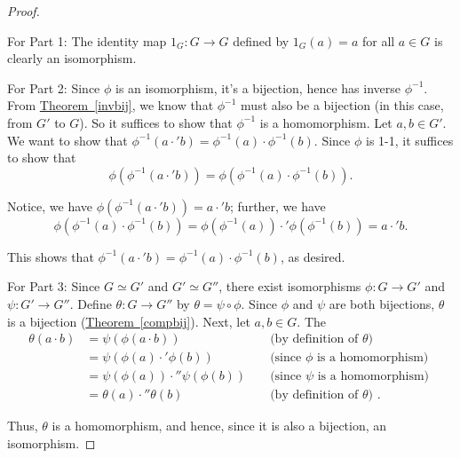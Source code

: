 \documentclass[10pt,]{book}
\theoremstyle{plain}
\theoremstyle{definition}
\theoremstyle{definition}
\theoremstyle{definition}
\theoremstyle{definition}
\numberwithin{equation}{section}
\newcommand{\amp}{ & }
\begin{document}
\begin{proof}\hypertarget{proof-16}{}

      For Part 1: The identity map \(1_G:G\to G\) defined by
      \(1_G(a)=a\) for all \(a\in G\) is clearly an isomorphism.
\par

      For Part 2: Since \(\phi\) is an isomorphism, it's a bijection, hence
      has inverse \(\phi^{-1}\). From \hyperref[invbij]{Theorem~\ref{invbij}}, we know that
      \(\phi^{-1}\) must also be a bijection (in this case, from \(G'\) to
      \(G\)). So it suffices to show that \(\phi^{-1}\) is a homomorphism.
      Let \(a,b\in G'\). We want to show that
      \(\phi^{-1}(a\cdot'b)=\phi^{-1}(a)\cdot\phi^{-1}(b)\). Since \(\phi\) is 1-1, it suffices to show that
\begin{equation*}

        \phi(\phi^{-1}(a\cdot'b))=\phi(\phi^{-1}(a)\cdot\phi^{-1}(b)).
      
\end{equation*}

\par

      Notice, we have
      \(\phi(\phi^{-1}(a\cdot'b))=a\cdot'b\); further, we have
\begin{equation*}

        \phi(\phi^{-1}(a)\cdot\phi^{-1}(b))=\phi(\phi^{-1}(a))\cdot'\phi(\phi^{-1}(b))=a\cdot'b.
      
\end{equation*}

\par

      This shows that
      \(\phi^{-1}(a\cdot'b)=\phi^{-1}(a)\cdot\phi^{-1}(b)\), as desired.
\par

      For Part 3: Since \(G\simeq G'\) and \(G'\simeq G''\), there exist
      isomorphisms \(\phi:G\to G'\) and \(\psi:G'\to G''\). Define
      \(\theta:G\to G''\) by \(\theta=\psi \circ \phi\). Since \(\phi\) and
      \(\psi\) are both bijections, \(\theta\) is a bijection (\hyperref[compbij]{Theorem~\ref{compbij}}). Next, let \(a,b\in G\). The
\begin{align*}
\theta(a\cdot b)\amp =\psi(\phi(a\cdot b))\amp \amp \text{ (by definition of \(\theta\)) }\\
\amp =\psi(\phi(a)\cdot'\phi(b))\amp \amp \text{ (since \(\phi\) is a homomorphism) }\\
\amp =\psi(\phi(a))\cdot''\psi(\phi(b))\amp \amp \text{ (since \(\psi\) is a homomorphism) }\\
\amp =\theta(a)\cdot''\theta(b)\amp \amp \text{ (by definition of \(\theta\)) } .
\end{align*}

\par

      Thus, \(\theta\) is a homomorphism, and hence, since it is also a bijection, an isomorphism.
\end{proof}
\end{document}
